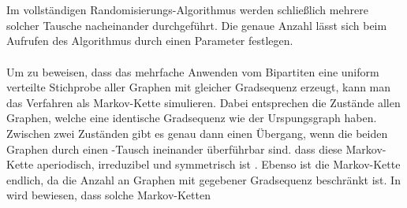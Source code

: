 \\
\\
Im vollständigen Randomisierungs-Algorithmus werden schließlich mehrere solcher \gc{} Tausche nacheinander
durchgeführt. Die genaue Anzahl lässt sich beim Aufrufen des Algorithmus durch einen Parameter festlegen.
\\
\\
Um zu beweisen, dass das mehrfache Anwenden vom Bipartiten \gc{} eine uniform verteilte
Stichprobe aller Graphen mit gleicher Gradsequenz erzeugt, kann man das Verfahren als Markov-Kette simulieren.
Dabei entsprechen die Zustände allen Graphen, welche eine identische Gradsequenz wie der Urspungsgraph haben.
Zwischen zwei Zuständen gibt es genau dann einen Übergang, wenn die beiden Graphen durch einen
\gc{}-Tausch ineinander überführbar sind.  dass diese Markov-Kette
aperiodisch, irreduzibel und symmetrisch ist \cite{...?} . Ebenso ist die Markov-Kette endlich, da die Anzahl an
Graphen mit gegebener Gradsequenz beschränkt ist. In \cite{....?} wird bewiesen, dass solche
Markov-Ketten 











